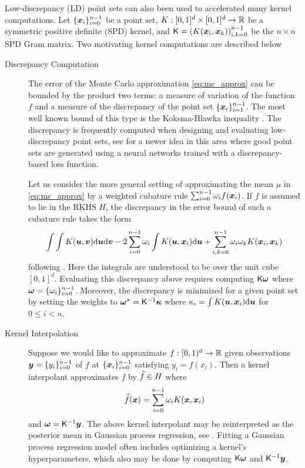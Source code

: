 \documentclass[acmsmall]{acmart}
\begin{document}
Low-discrepancy (LD) point sets can also been used to accelerated many kernel computations. Let $\{{\boldsymbol{x}}_i\}_{i=0}^{n-1}$ be a point set, $K: [0,1]^d \times [0,1]^d \to {\mathbb{R}}$ be a symmetric positive definite (SPD) kernel, and ${\mathsf{K}} = \left(K({\boldsymbol{x}}_i,{\boldsymbol{x}}_k)\right)_{i,k=0}^{n-1}$ be the $n \times n$ SPD Gram matrix. Two motivating kernel computations are described below

\begin{description}
    \item[Discrepancy Computation] The error of the Monte Carlo approximation \eqref{eq:mc_approx} can be bounded by the product two terms: a measure of variation of the function $f$ and a measure of the discrepancy of the point set $\{{\boldsymbol{x}}_i\}_{i=1}^{n-1}$.  The most well known bound of this type is the Koksma-Hlawka inequality \citep{hickernell.generalized_discrepancy_quadrature_error_bound,dick.high_dim_integration_qmc_way,hickernell1999goodness,niederreiter.qmc_book}. The discrepancy is frequently computed when designing and evaluating low-discrepancy point sets, see \citep{rusch2024message} for a newer idea in this area where good point sets are generated using a neural networks trained with a discrepancy-based loss function.  
    
    Let us consider the more general setting of approximating the mean $\mu$ in \eqref{eq:mc_approx} by a weighted cubature rule $\sum_{i=0}^{n-1} \omega_i f({\boldsymbol{x}}_i)$. If $f$ is assumed to lie in the RKHS $H$, the discrepancy in the error bound of such a cubature rule takes the form
    $$\int \int K({\boldsymbol{u}},{\boldsymbol{v}}) \mathrm{d} {\boldsymbol{u}} \mathrm{d} {\boldsymbol{v}} - 2 \sum_{i=0}^{n-1} \omega_i \int K({\boldsymbol{u}},{\boldsymbol{x}}_i) \mathrm{d} {\boldsymbol{u}} + \sum_{i,k=0}^{n-1} \omega_i \omega_k K({\boldsymbol{x}}_i,{\boldsymbol{x}}_k)$$
    following \citep{hickernell.generalized_discrepancy_quadrature_error_bound}. Here the integrals are understood to be over the unit cube $[0,1]^d$. Evaluating this discrepancy above requires computing ${\mathsf{K}} {\boldsymbol{\omega}}$ where ${\boldsymbol{\omega}} = \{\omega_i\}_{i=0}^{n-1}$. Moreover, the discrepancy is minimized for a given point set by setting the weights to ${\boldsymbol{\omega}}^\star = {\mathsf{K}}^{-1} {\boldsymbol{\kappa}}$ where $\kappa_i = \int K({\boldsymbol{u}},{\boldsymbol{x}}_i) \mathrm{d} {\boldsymbol{u}}$ for $0 \leq i < n$.
    \item[Kernel Interpolation] Suppose we would like to approximate $f: [0,1)^d \to {\mathbb{R}}$ given observations ${\boldsymbol{y}} = \{y_i\}_{i=0}^{n-1}$ of $f$ at $\{{\boldsymbol{x}}_i\}_{i=0}^{n-1}$ satisfying $y_i = f(x_i)$. Then a kernel interpolant approximates $f$ by ${\widehat{f}} \in H$ where 
    $${\widehat{f}}({\boldsymbol{x}}) = \sum_{i=0}^{n-1} \omega_i K({\boldsymbol{x}},{\boldsymbol{x}}_i)$$
    and ${\boldsymbol{\omega}} = {\mathsf{K}}^{-1} {\boldsymbol{y}}$. The above kernel interpolant may be reinterpreted as the posterior mean in Gaussian process regression, see \citep{rasmussen.gp4ml}. Fitting a Gaussian process regression model often includes optimizing a kernel's hyperparameters, which also may be done by computing  ${\mathsf{K}} {\boldsymbol{\omega}}$ and ${\mathsf{K}}^{-1} {\boldsymbol{y}}$.  %
\end{description}
\end{document}
